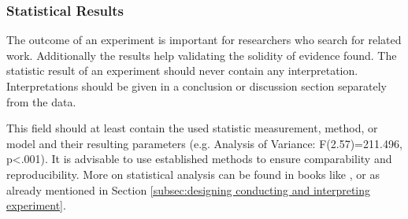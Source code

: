 
\subsubsection{Statistical Results}
\label{statisticalresults}

The outcome of an experiment is important for researchers who search for related work. Additionally the results help validating the solidity of evidence found. The statistic result of an experiment should never contain any interpretation. Interpretations should be given in a conclusion or discussion section separately from the data.

This field should at least contain the used statistic measurement, method, or model and their resulting parameters (e.g. Analysis of Variance: F(2.57)=211.496, p<.001). It is advisable to use established methods to ensure comparability and reproducibility. More on statistical analysis can be found in books like \cite{Wohlin2012}, or \cite{Albert2008} as already mentioned in Section \ref{subsec:designing conducting and interpreting experiment}.
